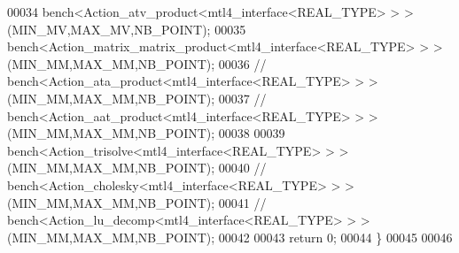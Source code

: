 \begin{DoxyCode}
00034   bench<Action\_atv\_product<mtl4\_interface<REAL\_TYPE> > >(MIN\_MV,MAX\_MV,NB\_POINT);
00035   bench<Action\_matrix\_matrix\_product<mtl4\_interface<REAL\_TYPE> > >(MIN\_MM,MAX\_MM,NB\_POINT);
00036 \textcolor{comment}{//   bench<Action\_ata\_product<mtl4\_interface<REAL\_TYPE> > >(MIN\_MM,MAX\_MM,NB\_POINT);}
00037 \textcolor{comment}{//   bench<Action\_aat\_product<mtl4\_interface<REAL\_TYPE> > >(MIN\_MM,MAX\_MM,NB\_POINT);}
00038 
00039   bench<Action\_trisolve<mtl4\_interface<REAL\_TYPE> > >(MIN\_MM,MAX\_MM,NB\_POINT);
00040 \textcolor{comment}{//   bench<Action\_cholesky<mtl4\_interface<REAL\_TYPE> > >(MIN\_MM,MAX\_MM,NB\_POINT);}
00041 \textcolor{comment}{//   bench<Action\_lu\_decomp<mtl4\_interface<REAL\_TYPE> > >(MIN\_MM,MAX\_MM,NB\_POINT);}
00042 
00043   \textcolor{keywordflow}{return} 0;
00044 \}
00045 
00046 
\end{DoxyCode}
